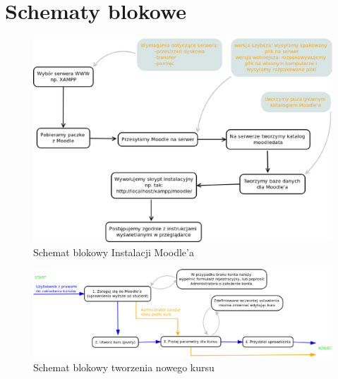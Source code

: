 \section{Schematy blokowe} \label{roz:schematy}
\begin{figure}[!h]
	\centering
		\caption[Instalacja Moodle'a]{Schemat blokowy Instalacji Moodle'a} \label{rys:instalacja}
		\includegraphics[width=1\textwidth]{projekt_sys//rys//instalacja.eps}
\end{figure}
\begin{figure}[!h]
	\centering
		\caption[Tworzenie kursu]{Schemat blokowy tworzenia nowego kursu} \label{rys:kurs}
		\includegraphics[width=1\textwidth]{projekt_sys//rys//nowy_kurs.eps}
\end{figure}
